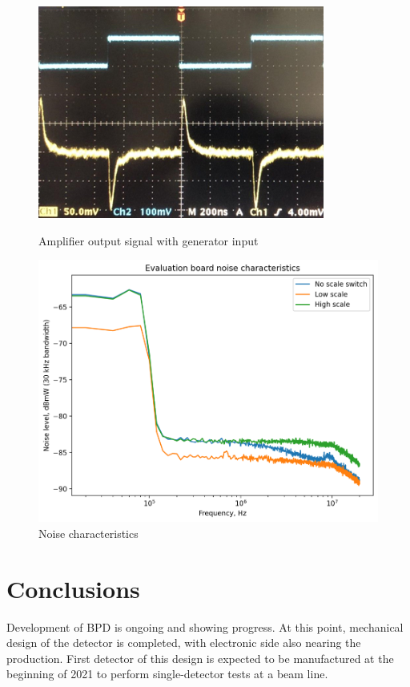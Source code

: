 \documentclass[a4paper]{jpconf}
\begin{document}
\begin{figure}[htbp]
	\begin{minipage}{18pc}
		\includegraphics[width=\textwidth]{osc.png}
		\caption{\label{fig:9} Amplifier output signal with generator input}
	\end{minipage}\hspace{2pc}
	\begin{minipage}{18pc}
		\includegraphics[width=\textwidth]{noise.png}
		\caption{\label{fig:10} Noise characteristics}
	\end{minipage} 
\end{figure}

\section{Conclusions}

Development of BPD is ongoing and showing progress. At this point, mechanical design of the detector is completed, with electronic side also nearing the production. First detector of this design is expected to be manufactured at the beginning of 2021 to perform single-detector tests at a beam line.
\end{document}
